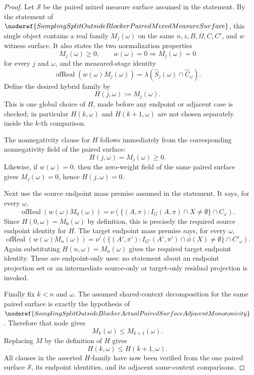 \begin{proof}
Let \(\mathcal S\) be the paired mixed measure surface assumed in the
statement.  By the statement of
\(\noderef{SamplingSplitOutsideBlockerPairedMixedMeasureSurface}\), this
single object contains a real family \(M_j(\omega)\) on the same
\(n,z,B,\Omega,C,C'\), and \(w\) witness surface.  It also states the two
normalization properties
\[
  M_j(\omega)\ge0,\qquad w(\omega)=0\Rightarrow M_j(\omega)=0
\]
for every \(j\) and \(\omega\), and the measured-stage identity
\[
\operatorname{ofReal}(w(\omega)M_j(\omega))
=\lambda(\widehat S_j(\omega)\cap\widehat C_\omega).
\]
Define the desired hybrid family by
\[
  H(j,\omega):=M_j(\omega).
\]
This is one global choice of \(H\), made before any endpoint or adjacent case
is checked; in particular \(H(k,\omega)\) and \(H(k+1,\omega)\) are not chosen
separately inside the \(k\)-th comparison.

The nonnegativity clause for \(H\) follows immediately from the corresponding
nonnegativity field of the paired surface:
\[
  H(j,\omega)=M_j(\omega)\ge0.
\]
Likewise, if \(w(\omega)=0\), then the zero-weight field of the same paired
surface gives \(M_j(\omega)=0\), hence \(H(j,\omega)=0\).

Next use the source endpoint mass premise assumed in the statement.  It says,
for every \(\omega\),
\[
\operatorname{ofReal}(w(\omega)M_0(\omega))
=\nu(\{(A,\pi): I_G(A,\pi)\cap X\ne\emptyset\}\cap C_\omega).
\]
Since \(H(0,\omega)=M_0(\omega)\) by definition, this is precisely the required
source endpoint identity for \(H\).  The target endpoint mass premise says,
for every \(\omega\),
\[
\operatorname{ofReal}(w(\omega)M_n(\omega))
=\nu'(\{(A',\pi'): I_{G'}(A',\pi')\cap \phi(X)\ne\emptyset\}\cap C'_\omega).
\]
Again substituting \(H(n,\omega)=M_n(\omega)\) gives the required target
endpoint identity.  These are endpoint-only uses: no statement about an
endpoint projection set or an intermediate source-only or target-only
residual projection is invoked.

Finally fix \(k<n\) and \(\omega\).  The assumed shared-context decomposition
for the same paired surface is exactly the hypothesis of
\(\noderef{SamplingSplitOutsideBlockerActualPairedSurfaceAdjacentMonotonicity}\).
Therefore that node gives
\[
  M_k(\omega)\le M_{k+1}(\omega).
\]
Replacing \(M\) by the definition of \(H\) gives
\[
  H(k,\omega)\le H(k+1,\omega).
\]
All clauses in the asserted \(H\)-family have now been verified from the one
paired surface \(\mathcal S\), its endpoint identities, and its adjacent
same-context comparisons.
\end{proof}
